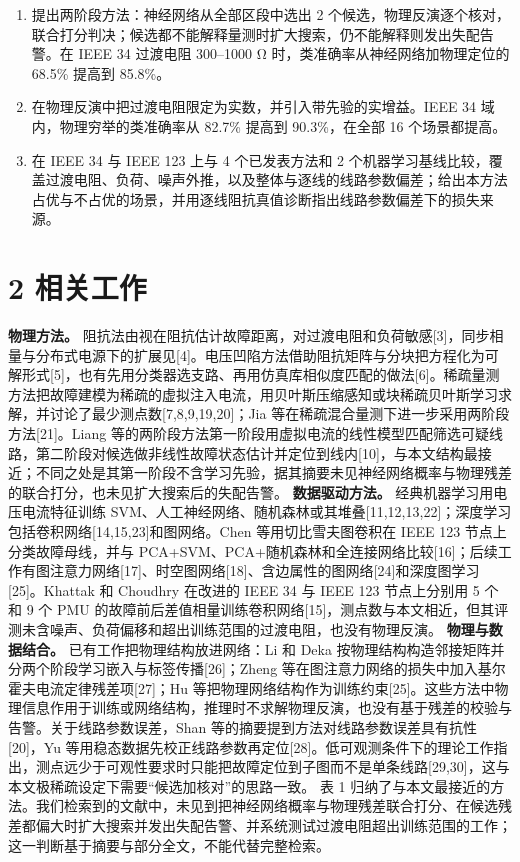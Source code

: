 \documentclass[
  11pt,
]{ctexart}
\providecommand{\tightlist}{%
  \setlength{\itemsep}{0pt}\setlength{\parskip}{0pt}}
\begin{document}
\begin{enumerate}
\def\labelenumi{\arabic{enumi}.}
\tightlist
\item
  提出两阶段方法：神经网络从全部区段中选出 2
  个候选，物理反演逐个核对，联合打分判决；候选都不能解释量测时扩大搜索，仍不能解释则发出失配告警。在
  IEEE 34 过渡电阻 300--1000 Ω 时，类准确率从神经网络加物理定位的 68.5\%
  提高到 85.8\%。
\item
  在物理反演中把过渡电阻限定为实数，并引入带先验的实增益。IEEE 34
  域内，物理穷举的类准确率从 82.7\% 提高到 90.3\%，在全部 16
  个场景都提高。
\item
  在 IEEE 34 与 IEEE 123 上与 4 个已发表方法和 2
  个机器学习基线比较，覆盖过渡电阻、负荷、噪声外推，以及整体与逐线的线路参数偏差；给出本方法占优与不占优的场景，并用逐线阻抗真值诊断指出线路参数偏差下的损失来源。
\end{enumerate}

\hypertarget{ux76f8ux5173ux5de5ux4f5c}{%
\section{2 相关工作}\label{ux76f8ux5173ux5de5ux4f5c}}

\textbf{物理方法。}
阻抗法由视在阻抗估计故障距离，对过渡电阻和负荷敏感{[}3{]}，同步相量与分布式电源下的扩展见{[}4{]}。电压凹陷方法借助阻抗矩阵与分块把方程化为可解形式{[}5{]}，也有先用分类器选支路、再用仿真库相似度匹配的做法{[}6{]}。稀疏量测方法把故障建模为稀疏的虚拟注入电流，用贝叶斯压缩感知或块稀疏贝叶斯学习求解，并讨论了最少测点数{[}7,8,9,19,20{]}；Jia
等在稀疏混合量测下进一步采用两阶段方法{[}21{]}。Liang
等的两阶段方法第一阶段用虚拟电流的线性模型匹配筛选可疑线路，第二阶段对候选做非线性故障状态估计并定位到线内{[}10{]}，与本文结构最接近；不同之处是其第一阶段不含学习先验，据其摘要未见神经网络概率与物理残差的联合打分，也未见扩大搜索后的失配告警。
\textbf{数据驱动方法。} 经典机器学习用电压电流特征训练
SVM、人工神经网络、随机森林或其堆叠{[}11,12,13,22{]}；深度学习包括卷积网络{[}14,15,23{]}和图网络。Chen
等用切比雪夫图卷积在 IEEE 123 节点上分类故障母线，并与
PCA+SVM、PCA+随机森林和全连接网络比较{[}16{]}；后续工作有图注意力网络{[}17{]}、时空图网络{[}18{]}、含边属性的图网络{[}24{]}和深度图学习{[}25{]}。Khattak
和 Choudhry 在改进的 IEEE 34 与 IEEE 123 节点上分别用 5 个和 9 个 PMU
的故障前后差值相量训练卷积网络{[}15{]}，测点数与本文相近，但其评测未含噪声、负荷偏移和超出训练范围的过渡电阻，也没有物理反演。
\textbf{物理与数据结合。} 已有工作把物理结构放进网络：Li 和 Deka
按物理结构构造邻接矩阵并分两个阶段学习嵌入与标签传播{[}26{]}；Zheng
等在图注意力网络的损失中加入基尔霍夫电流定律残差项{[}27{]}；Hu
等把物理网络结构作为训练约束{[}25{]}。这些方法中物理信息作用于训练或网络结构，推理时不求解物理反演，也没有基于残差的校验与告警。关于线路参数误差，Shan
等的摘要提到方法对线路参数误差具有抗性{[}20{]}，Yu
等用稳态数据先校正线路参数再定位{[}28{]}。低可观测条件下的理论工作指出，测点远少于可观性要求时只能把故障定位到子图而不是单条线路{[}29,30{]}，这与本文极稀疏设定下需要``候选加核对''的思路一致。
表 1
归纳了与本文最接近的方法。我们检索到的文献中，未见到把神经网络概率与物理残差联合打分、在候选残差都偏大时扩大搜索并发出失配告警、并系统测试过渡电阻超出训练范围的工作；这一判断基于摘要与部分全文，不能代替完整检索。
\end{document}

